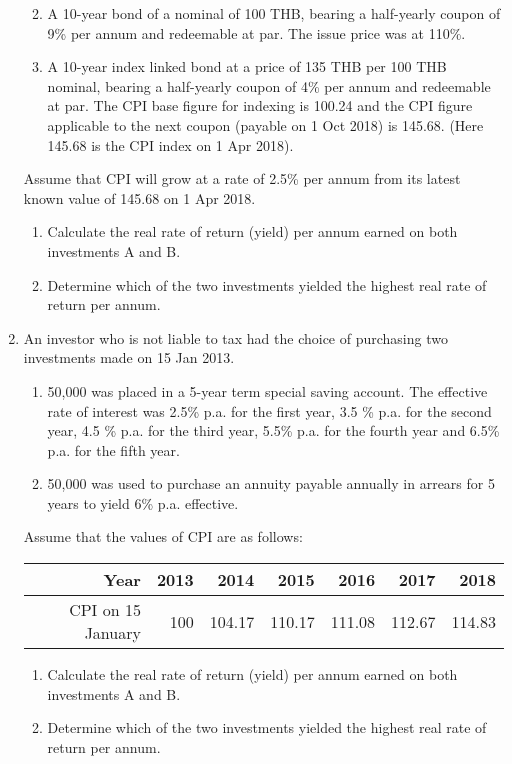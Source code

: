 \documentclass[
]{article}
\theoremstyle{definition}
\theoremstyle{definition}
\theoremstyle{definition}
\theoremstyle{definition}
\theoremstyle{remark}
\begin{document}
\begin{enumerate}
  \begin{enumerate}
  \def\labelenumii{(\Alph{enumii})}
  \item
    A 10-year bond of a nominal of 100 THB, bearing a half-yearly coupon of
    9\% per annum and redeemable at par. The issue price was at 110\%.
  \item
    A 10-year index linked bond at a price of 135 THB per 100 THB nominal, bearing a
    half-yearly coupon of 4\% per annum and redeemable at par. The
    CPI base figure for indexing is 100.24 and the CPI figure
    applicable to the next coupon (payable on 1 Oct 2018) is 145.68.
    (Here 145.68 is the CPI index on 1 Apr 2018).
  \end{enumerate}

  Assume that CPI will grow at a rate of 2.5\% per annum from its
  latest known value of 145.68 on 1 Apr 2018.

  \begin{enumerate}
  \def\labelenumii{\arabic{enumii}.}
  \item
    Calculate the real rate of return (yield) per annum earned on
    both investments A and B.
  \item
    Determine which of the two investments yielded the highest real
    rate of return per annum.
  \end{enumerate}
\item
  An investor who is not liable to tax had the choice of purchasing
  two investments made on 15 Jan 2013.

  \begin{enumerate}
  \def\labelenumii{(\Alph{enumii})}
  \item
    50,000 was placed in a 5-year term special saving account. The
    effective rate of interest was 2.5\% p.a. for the first year, 3.5
    \% p.a. for the second year, 4.5 \% p.a. for the third year, 5.5\%
    p.a. for the fourth year and 6.5\% p.a. for the fifth year.
  \item
    50,000 was used to purchase an annuity payable annually in arrears
    for 5 years to yield 6\% p.a. effective.
  \end{enumerate}

  Assume that the values of CPI are as follows:

  \begin{longtable}[]{@{}rrrrrrr@{}}
  \toprule
  Year & 2013 & 2014 & 2015 & 2016 & 2017 & 2018 \\
  \midrule
  \endhead
  CPI on 15 January & 100 & 104.17 & 110.17 & 111.08 & 112.67 & 114.83 \\
  \bottomrule
  \end{longtable}

  \begin{enumerate}
  \def\labelenumii{\arabic{enumii}.}
  \item
    Calculate the real rate of return (yield) per annum earned on
    both investments A and B.
  \item
    Determine which of the two investments yielded the highest real
    rate of return per annum.
  \end{enumerate}
\end{enumerate}
\end{document}
